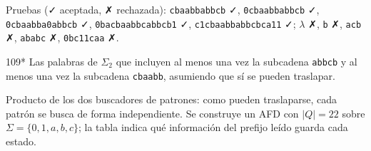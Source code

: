 \documentclass[11pt]{article}
\begin{document}
Pruebas (✓ aceptada, ✗ rechazada): \texttt{cbaabbabbcb} ✓, \texttt{0cbaabbabbcb} ✓, \texttt{0cbaabba0abbcb} ✓, \texttt{0bacbaabbcabbcb1} ✓, \texttt{c1cbaabbabbcbca11} ✓; $\lambda$ ✗, \texttt{b} ✗, \texttt{acb} ✗, \texttt{ababc} ✗, \texttt{0bc11caa} ✗.



\begin{ejercicio}{109}{*}
Las palabras de $\Sigma_2$ que incluyen al menos una vez la subcadena \texttt{abbcb} y al menos una vez la subcadena \texttt{cbaabb}, asumiendo que sí se pueden traslapar.
\end{ejercicio}
\proc Producto de los dos buscadores de patrones: como pueden traslaparse, cada patrón se busca de forma independiente. Se construye un AFD con $|Q| = 22$ sobre $\Sigma = \{0, 1, a, b, c\}$; la tabla indica qué información del prefijo leído guarda cada estado.
\end{document}
